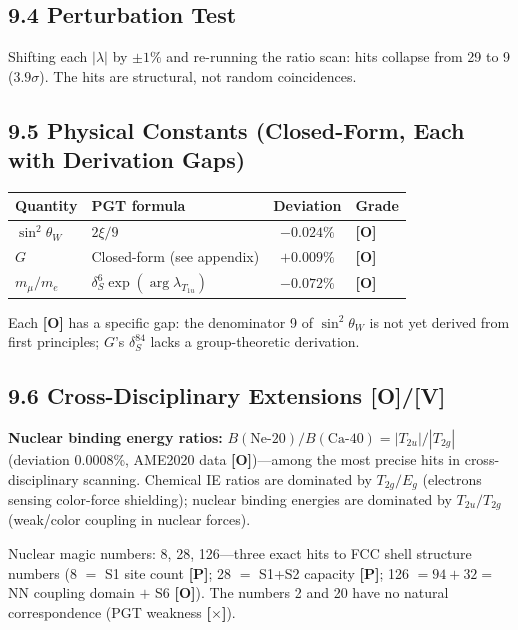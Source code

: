 \documentclass[11pt,a4paper]{article}
\newcommand{\gradeP}{\textbf{[P]}}
\newcommand{\gradeV}{\textbf{[V]}}
\newcommand{\gradeO}{\textbf{[O]}}
\newcommand{\gradeX}{\textbf{[$\times$]}}
\begin{document}
\subsection{9.4 Perturbation Test}

Shifting each $|\lambda|$ by $\pm 1\%$ and re-running the ratio scan: hits collapse from 29 to 9 ($3.9\sigma$). The hits are structural, not random coincidences.

\subsection{9.5 Physical Constants (Closed-Form, Each with Derivation Gaps)}

\begin{center}
\begin{tabular}{llcl}
\toprule
Quantity & PGT formula & Deviation & Grade \\
\midrule
$\sin^2\theta_W$ & $2\xi/9$ & $-0.024\%$ & \gradeO \\
$G$ & Closed-form (see appendix) & $+0.009\%$ & \gradeO \\
$m_\mu/m_e$ & $\delta_S^6\exp(\arg\lambda_{T_{1u}})$ & $-0.072\%$ & \gradeO \\
\bottomrule
\end{tabular}
\end{center}

Each \gradeO{} has a specific gap: the denominator 9 of $\sin^2\theta_W$ is not yet derived from first principles; $G$'s $\delta_S^{84}$ lacks a group-theoretic derivation.

\subsection{9.6 Cross-Disciplinary Extensions \gradeO/\gradeV}

\textbf{Nuclear binding energy ratios:} $B(\text{Ne-20})/B(\text{Ca-40}) = |T_{2u}|/|T_{2g}|$ (deviation 0.0008\%, AME2020 data \gradeO)---among the most precise hits in cross-disciplinary scanning. Chemical IE ratios are dominated by $T_{2g}/E_g$ (electrons sensing color-force shielding); nuclear binding energies are dominated by $T_{2u}/T_{2g}$ (weak/color coupling in nuclear forces).

Nuclear magic numbers: 8, 28, 126---three exact hits to FCC shell structure numbers (8 $=$ S1 site count \gradeP; 28 $=$ S1+S2 capacity \gradeP; 126 $= 94+32 =$ NN coupling domain $+$ S6 \gradeO). The numbers 2 and 20 have no natural correspondence (PGT weakness \gradeX).
\end{document}
